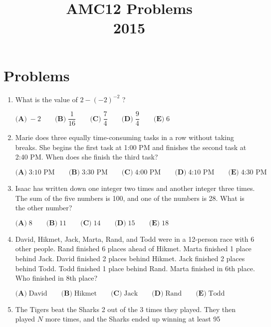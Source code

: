 \documentclass{article}
\title{AMC12 Problems \\ 2015}
\date{}
\begin{document}
\maketitle\thispagestyle{fancy}\newpage\section*{Problems}\begin{enumerate}[label=\arabic*., itemsep=0.5em]\item What is the value of $2-(-2)^{-2}$ ?

$\textbf{(A)}\; -2 \qquad\textbf{(B)}\; \dfrac{1}{16} \qquad\textbf{(C)}\; \dfrac{7}{4} \qquad\textbf{(D)}\; \dfrac{9}{4} \qquad\textbf{(E)}\; 6$\par \vspace{0.5em}\item Marie does three equally time-consuming tasks in a row without taking breaks. She begins the first task at 1:00 PM and finishes the second task at 2:40 PM. When does she finish the third task?

$\textbf{(A)}\; \text{3:10 PM} \qquad\textbf{(B)}\; \text{3:30 PM} \qquad\textbf{(C)}\; \text{4:00 PM} \qquad\textbf{(D)}\; \text{4:10 PM} \qquad\textbf{(E)}\; \text{4:30 PM}$\par \vspace{0.5em}\item Isaac has written down one integer two times and another integer three times. The sum of the five numbers is 100, and one of the numbers is 28. What is the other number?

$\textbf{(A)}\; 8 \qquad\textbf{(B)}\; 11 \qquad\textbf{(C)}\; 14 \qquad\textbf{(D)}\; 15 \qquad\textbf{(E)}\; 18$\par \vspace{0.5em}\item David, Hikmet, Jack, Marta, Rand, and Todd were in a 12-person race with 6 other people. Rand finished 6 places ahead of Hikmet. Marta finished 1 place behind Jack. David finished 2 places behind Hikmet. Jack finished 2 places behind Todd. Todd finished 1 place behind Rand. Marta finished in 6th place. Who finished in 8th place?

$\textbf{(A)}\; \text{David} \qquad\textbf{(B)}\; \text{Hikmet} \qquad\textbf{(C)}\; \text{Jack} \qquad\textbf{(D)}\; \text{Rand} \qquad\textbf{(E)}\; \text{Todd}$\par \vspace{0.5em}\item The Tigers beat the Sharks 2 out of the 3 times they played. They then played $N$ more times, and the Sharks ended up winning at least 95%


\end{enumerate}
\end{document}
